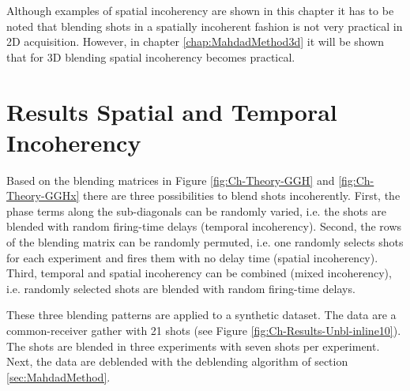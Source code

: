 Although examples of spatial incoherency are shown in this chapter it has to be noted that blending shots in a spatially incoherent fashion is not very practical in 2D acquisition. However, in chapter \ref{chap:MahdadMethod3d} it will be shown that for 3D blending spatial incoherency becomes practical.

\FloatBarrier

\section{Results Spatial and Temporal Incoherency}

Based on the blending matrices in Figure \ref{fig:Ch-Theory-GGH} and \ref{fig:Ch-Theory-GGHx} there are three possibilities to blend shots incoherently. First, the phase terms along the sub-diagonals can be randomly varied, i.e. the shots are blended with random firing-time delays (temporal incoherency). Second, the rows of the blending matrix can be randomly permuted, i.e. one randomly selects shots for each experiment and fires them with no delay time (spatial incoherency). Third, temporal and spatial incoherency can be combined (mixed incoherency), i.e. randomly selected shots are blended with random firing-time delays.

These three blending patterns are applied to a synthetic dataset. The data are a common-receiver gather with 21 shots (see Figure \ref{fig:Ch-Results-Unbl-inline10}). The shots are blended in three experiments with seven shots per experiment. Next, the data are deblended with the deblending algorithm of section \ref{sec:MahdadMethod}. 

